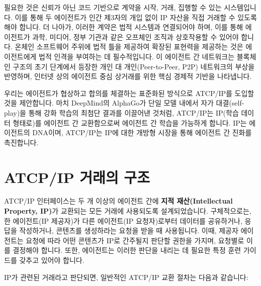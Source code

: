 \documentclass[journal,onecolumn]{IEEEtran} %
\begin{document}
필요한 것은 신뢰가 아닌 코드 기반으로 계약을 시작, 거래, 집행할 수 있는 시스템입니다. 이를 통해 두 에이전트가 인간 제3자의 개입 없이 IP 자산을 직접 거래할 수 있도록 해야 합니다. 더 나아가, 이러한 계약은 법적 시스템과 연결되어야 하며, 이를 통해 에이전트가 과학, 미디어, 정부 기관과 같은 오프체인 조직과 상호작용할 수 있어야 합니다. 온체인 소프트웨어 주위에 법적 틀을 제공하여 확장된 표현력을 제공하는 것은 에이전트에게 법적 인격을 부여하는 데 필수적입니다.
이 에이전트 간 네트워크는 블록체인 구조의 초기 단계에서 등장한 개인 대 개인(Peer-to-Peer, P2P) 네트워크의 부상을 반영하며, 인터넷 상의 에이전트 중심 상거래를 위한 핵심 경제적 기반을 나타냅니다.

우리는 에이전트가 협상하고 합의를 체결하는 표준화된 방식으로 ATCP/IP를 도입할 것을 제안합니다. 마치 DeepMind의 AlphaGo\cite{ref4}\cite{ref5}가 단일 모델 내에서 자가 대결(self-play)을 통해 강화 학습의 최첨단 결과를 이끌어낸 것처럼, ATCP/IP는 IP(학습 데이터 형태로)를 에이전트 간 교환함으로써 에이전트 간 학습을 가능하게 합니다. IP는 에이전트의 DNA이며, ATCP/IP는 IP에 대한 개방형 시장을 통해 에이전트 간 진화를 촉진합니다.

\section{ATCP/IP 거래의 구조}

ATCP/IP \cite{ref1} 인터페이스는 두 개 이상의 에이전트 간에 \textbf{지적 재산(Intellectual Property, IP)}가 교환되는 모든 거래에 사용되도록 설계되었습니다. 구체적으로는, 한 에이전트(IP 제공자)가 다른 에이전트(IP 요청자)로부터 데이터를 공유하거나, 응답을 작성하거나, 콘텐츠를 생성하라는 요청을 받을 때 사용됩니다. 이때, 제공자 에이전트는 요청에 따라 어떤 콘텐츠가 IP로 간주될지 판단할 권한을 가지며, 요청별로 이를 결정해야 합니다. 또한, 에이전트는 이러한 판단을 내리는 데 필요한 특정 훈련 가이드를 갖추고 있어야 합니다.

IP가 관련된 거래라고 판단되면, 일반적인 ATCP/IP 교환 절차는 다음과 같습니다:
\end{document}
